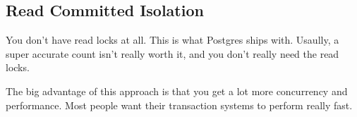 \documentclass[psamsfonts]{amsart}
\begin{document}
\subsection{Read Committed Isolation}

You don't have read locks at all. This is what Postgres ships with. Usaully, a super accurate count isn't really worth it, and you don't really need the read locks.

The big advantage of this approach is that you get a lot more concurrency and performance. Most people want their transaction systems to perform really fast.
\end{document}
